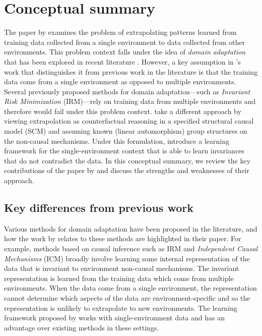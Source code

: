

\section{Conceptual summary}

The paper by \textcite{Mouli:2021} examines the problem of extrapolating patterns learned from training data collected from a single environment to data collected from other environments. This problem context falls under the idea of \textit{domain adaptation} that has been explored in recent literature \parencite{Farahani:2020}. However, a key assumption in \citeauthor{Mouli:2021}'s work that distinguishes it from previous work in the literature is that the training data come from a single environment as opposed to multiple environments. Several previously proposed methods for domain adaptation---such as \textit{Invariant Risk Minimization} \parencite{Arjovsky:2020} (IRM)---rely on training data from multiple environments and therefore would fail under this problem context. \citeauthor{Mouli:2021} take a different approach by viewing extrapolation as counterfactual reasoning in a specified structural causal model (SCM) and assuming known (linear automorphism) group structures on the non-causal mechanisms. Under this formulation, \citeauthor{Mouli:2021} introduce a learning framework for the single-environment context that is able to learn invariances that do not contradict the data. In this conceptual summary, we review the key contributions of the paper by \textcite{Mouli:2021} and discuss the strengths and weaknesses of their approach.


\subsection{Key differences from previous work}

Various methods for domain adaptation have been proposed in the literature, and how the work by \textcite{Mouli:2021} relates to these methods are highlighted in their paper. For example, methods based on causal inference such as IRM and \textit{Independent Causal Mechanisms} \parencite{Parascandolo:2018} (ICM) broadly involve learning some internal representation of the data that is invariant to environment non-causal mechanisms. The invariant representation is learned from the training data which come from multiple environments. When the data come from a single environment, the representation cannot determine which aspects of the data are environment-specific and so the representation is unlikely to extrapolate to new environments. The learning framework proposed by \citeauthor{Mouli:2021} works with single-environment data and has an advantage over existing methods in these settings.
\\

